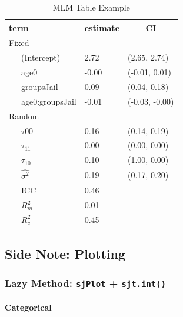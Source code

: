 \documentclass[]{article}
\let\oldparagraph\paragraph
\renewcommand{\paragraph}[1]{\oldparagraph{#1}\mbox{}}
\begin{document}
\begin{table}[tbp]
\begin{center}
\begin{threeparttable}
\caption{\label{tab:unnamed-chunk-28}MLM Table Example}
\begin{tabular}{lll}
\toprule
term & \multicolumn{1}{c}{estimate} & \multicolumn{1}{c}{CI}\\
\midrule
Fixed &  & \\
\ \ \ (Intercept) & 2.72 & (2.65, 2.74)\\
\ \ \ age0 & -0.00 & (-0.01, 0.01)\\
\ \ \ groupsJail & 0.09 & (0.04, 0.18)\\
\ \ \ age0:groupsJail & -0.01 & (-0.03, -0.00)\\
Random &  & \\
\ \ \ $\tau{00}$ & 0.16 & (0.14, 0.19)\\
\ \ \ $\tau_{11}$ & 0.00 & (0.00, 0.00)\\
\ \ \ $\tau_{10}$ & 0.10 & (1.00, 0.00)\\
\ \ \ $\hat{\sigma^2}$ & 0.19 & (0.17, 0.20)\\
\ \ \ ICC & 0.46 & \\
\ \ \ $R^2_m$ & 0.01 & \\
\ \ \ $R^2_c$ & 0.45 & \\
\bottomrule
\end{tabular}
\end{threeparttable}
\end{center}
\end{table}

\normalsize

\subsection{Side Note: Plotting}\label{side-note-plotting}

\subsubsection{\texorpdfstring{Lazy Method: \texttt{sjPlot} +
\texttt{sjt.int()}}{Lazy Method: sjPlot + sjt.int()}}\label{lazy-method-sjplot-sjt.int}

\paragraph{Categorical}\label{categorical}

\small
\end{document}
